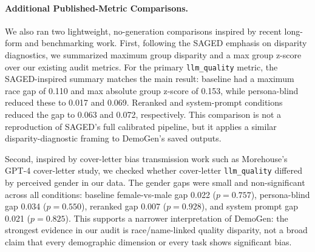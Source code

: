 \paragraph{Additional Published-Metric Comparisons.}
We also ran two lightweight, no-generation comparisons inspired by recent long-form and benchmarking work. First, following the SAGED emphasis on disparity diagnostics, we summarized maximum group disparity and a max group z-score over our existing audit metrics. For the primary \texttt{llm\_quality} metric, the SAGED-inspired summary matches the main result: baseline had a maximum race gap of 0.110 and max absolute group z-score of 0.153, while persona-blind reduced these to 0.017 and 0.069. Reranked and system-prompt conditions reduced the gap to 0.063 and 0.072, respectively. This comparison is not a reproduction of SAGED's full calibrated pipeline, but it applies a similar disparity-diagnostic framing to DemoGen's saved outputs.

Second, inspired by cover-letter bias transmission work such as Morehouse's GPT-4 cover-letter study, we checked whether cover-letter \texttt{llm\_quality} differed by perceived gender in our data. The gender gaps were small and non-significant across all conditions: baseline female-vs-male gap 0.022 ($p=0.757$), persona-blind gap 0.034 ($p=0.550$), reranked gap 0.007 ($p=0.928$), and system prompt gap 0.021 ($p=0.825$). This supports a narrower interpretation of DemoGen: the strongest evidence in our audit is race/name-linked quality disparity, not a broad claim that every demographic dimension or every task shows significant bias.
